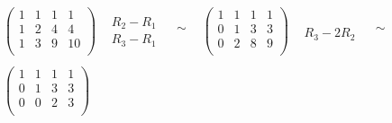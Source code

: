 \documentclass[12pt]{scrartcl}
\begin{document}
\begin{enumerate}
\begin{enumerate}
			\begin{equation}\label{firstStepsToSolve}
			\begin{split}
				\begin{array}{cccccc}
					\left(
					\begin{array}{ccc|c}
						1	&	1	&	1	&	1 \\
						1	&	2	&	4	&	4 \\
						1	&	3	&	9	&	10 \\
					\end{array}
					\right)
					&
					\begin{array}{c}
									\\
					R_2 - R_1		 \\
					R_3 - R_1		\\
					\end{array}
					&
					\begin{array}{c}
					 \\
					 \sim\\
					 \\
					\end{array}
					&
					\left(
					\begin{array}{ccc|c}
						1	&	1	&	1	&	1 \\
						0	&	1	&	3	&	3 \\
						0	&	2	&	8	&	9 \\
					\end{array}
					\right)
					&
					\begin{array}{c}
								\\
								 \\
					R_3 - 2R_2	\\
					\end{array}
					&
					\begin{array}{c}
					 \\
					 \sim\\
					 \\
					\end{array}
					\\
					\\
					\left(
					\begin{array}{ccc|c}
						1	&	1	&	1	&	1 \\
						0	&	1	&	3	&	3 \\
						0	&	0	&	2	&	3 \\
					\end{array}
					\right)
					&
					\begin{array}{c}
									\\

\end{array}
\end{array}
\end{split}
\end{equation}
\end{enumerate}
\end{enumerate}
\end{document}
